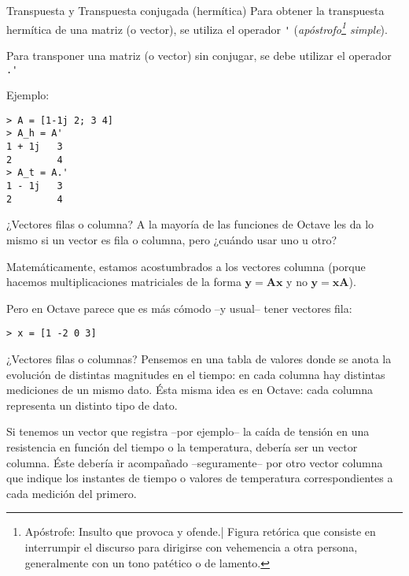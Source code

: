 \begin{frame}[fragile]{Transpuesta y Transpuesta conjugada (hermítica)}
	Para obtener la transpuesta hermítica de una matriz (o vector), se utiliza el operador \verb!'! (\emph{apóstrofo\footnote{Apóstrofe: Insulto que provoca y ofende.| Figura retórica que consiste en interrumpir el discurso para dirigirse con vehemencia a otra persona, generalmente con un tono patético o de lamento.} simple}).
    
    Para transponer una matriz (o vector) sin conjugar, se debe utilizar el operador \verb!.'!
    
    Ejemplo:
\begin{lstlisting}
> A = [1-1j 2; 3 4]
> A_h = A'
1 + 1j   3
2        4
> A_t = A.'
1 - 1j   3
2        4\end{lstlisting}
\end{frame}
\begin{frame}[fragile]{¿Vectores filas o columna?}
	A la mayoría de las funciones de Octave les da lo mismo si un vector es fila o columna, pero ¿cuándo usar uno u otro?
    
	Matemáticamente, estamos acostumbrados a los vectores columna (porque hacemos multiplicaciones matriciales de la forma $\mathbf{y} = \mathbf{A} \mathbf{x}$ y no $\mathbf{y} = \mathbf{x} \mathbf{A}$).
    
    Pero en Octave parece que es más cómodo --y usual-- tener vectores fila:
\begin{lstlisting}
> x = [1 -2 0 3]
\end{lstlisting}
\end{frame}

\begin{frame}[fragile]{¿Vectores filas o columnas?}
	Pensemos en una tabla de valores donde se anota la evolución de distintas magnitudes en el tiempo: en cada columna hay distintas mediciones de un mismo dato. Ésta misma idea es en Octave: cada columna representa un distinto tipo de dato.
    
    Si tenemos un vector que registra --por ejemplo-- la caída de tensión en una resistencia en función del tiempo o la temperatura, debería ser un vector columna. Éste debería ir acompañado --seguramente-- por otro vector columna que indique los instantes de tiempo o valores de temperatura correspondientes a cada medición del primero.  
\end{frame}

